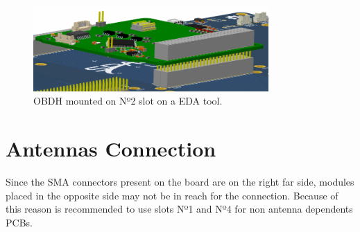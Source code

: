 \begin{figure}[!ht]
    \begin{center}
        \includegraphics[width=0.8\textwidth]{figures/obdh2_mouting.png}
        \caption{OBDH mounted on Nº2 slot on a EDA tool.}
        \label{fig:obdh2-mouting}
    \end{center}
\end{figure}

\section{Antennas Connection}

Since the SMA connectors present on the board are on the right far side, modules placed in the opposite side may not be in reach for the connection. Because of this reason is recommended to use slots Nº1 and Nº4 for non antenna dependents PCBs.
